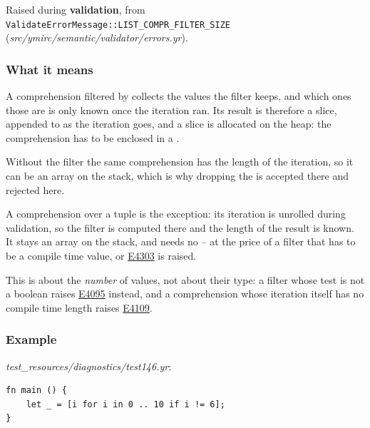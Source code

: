 \label{sec:codes:e4302}

Raised during \textbf{validation}, from \texttt{ValidateErrorMessage::\allowbreak{}LIST\_\allowbreak{}COMPR\_\allowbreak{}FILTER\_\allowbreak{}SIZE} (\textit{src/\allowbreak{}ymirc/\allowbreak{}semantic/\allowbreak{}validator/\allowbreak{}errors.yr}).

\subsubsection*{What it means}

A comprehension filtered by  collects the values the filter keeps, and which ones those are is only known once the iteration ran. Its result is therefore a slice, appended to as the iteration goes, and a slice is allocated on the heap: the comprehension has to be enclosed in a .

Without the filter the same comprehension has the length of the iteration, so it can be an array on the stack, which is why dropping the  is accepted there and rejected here.

A comprehension over a tuple is the exception: its iteration is unrolled during validation, so the filter is computed there and the length of the result is known. It stays an array on the stack, and needs no  -- at the price of a filter that has to be a compile time value, or \hyperref[sec:codes:e4303]{E4303} is raised.

This is about the \textit{number} of values, not about their type: a filter whose test is not a boolean raises \hyperref[sec:codes:e4095]{E4095} instead, and a comprehension whose iteration itself has no compile time length raises \hyperref[sec:codes:e4109]{E4109}.

\subsubsection*{Example}

\textit{test\_\allowbreak{}resources/\allowbreak{}diagnostics/\allowbreak{}test146.yr}:

\begin{lstlisting}[style=coloredverbatimError]
fn main () {
    let _ = [i for i in 0 .. 10 if i != 6];
}
\end{lstlisting}

